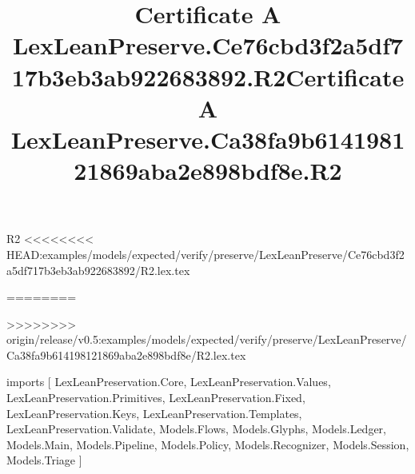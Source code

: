 \begin{lexlean}{R2}
<<<<<<<< HEAD:examples/models/expected/verify/preserve/LexLeanPreserve/Ce76cbd3f2a5df717b3eb3ab922683892/R2.lex.tex
\title{Certificate A LexLeanPreserve.Ce76cbd3f2a5df717b3eb3ab922683892.R2}
========
\title{Certificate A LexLeanPreserve.Ca38fa9b614198121869aba2e898bdf8e.R2}
>>>>>>>> origin/release/v0.5:examples/models/expected/verify/preserve/LexLeanPreserve/Ca38fa9b614198121869aba2e898bdf8e/R2.lex.tex
\begin{coremodule}
imports [
  LexLeanPreservation.Core,
  LexLeanPreservation.Values,
  LexLeanPreservation.Primitives,
  LexLeanPreservation.Fixed,
  LexLeanPreservation.Keys,
  LexLeanPreservation.Templates,
  LexLeanPreservation.Validate,
  Models.Flows,
  Models.Glyphs,
  Models.Ledger,
  Models.Main,
  Models.Pipeline,
  Models.Policy,
  Models.Recognizer,
  Models.Session,
  Models.Triage
]


\end{coremodule}
\end{lexlean}
